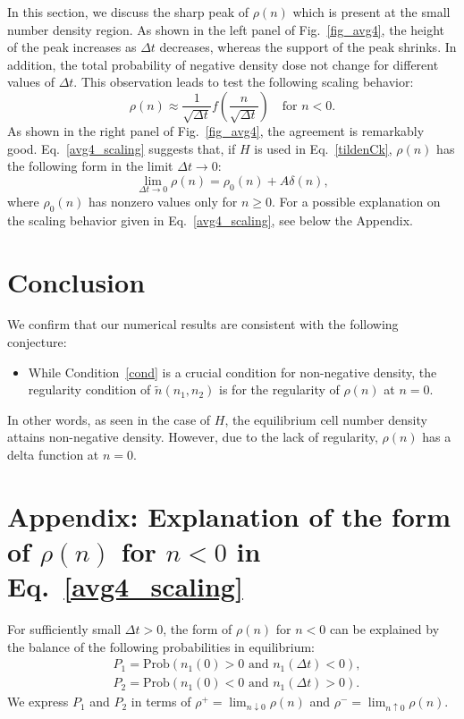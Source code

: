 \documentclass{article}
\begin{document}
In this section, we discuss the sharp peak of $\rho(n)$ which is present at the small number density region.
As shown in the left panel of Fig.~\ref{fig_avg4}, the height of the peak increases as $\Delta t$ decreases, whereas the support of the peak shrinks.
In addition, the total probability of negative density dose not change for different values of $\Delta t$.
This observation leads to test the following scaling behavior:
\begin{equation}
\label{avg4_scaling}
\rho(n)\approx \frac{1}{\sqrt{\Delta t}}f\left(\frac{n}{\sqrt{\Delta t}}\right)\quad\mbox{for $n<0$}.
\end{equation}
As shown in the right panel of Fig.~\ref{fig_avg4}, the agreement is remarkably good.
Eq.~\eqref{avg4_scaling} suggests that, if $H$ is used in Eq.~\eqref{tildenCk}, $\rho(n)$ has the following form in the limit $\Delta t\rightarrow 0$:
\begin{equation}
\lim_{\Delta t\rightarrow 0}\rho(n)=\rho_0(n)+A\delta(n),
\end{equation}
where $\rho_0(n)$ has nonzero values only for $n\ge0$.
For a possible explanation on the scaling behavior given in Eq.~\eqref{avg4_scaling}, see below the Appendix.

\section{Conclusion}

We confirm that our numerical results are consistent with the following conjecture:
\begin{itemize}
\item While Condition~\eqref{cond} is a crucial condition for non-negative density, the regularity condition of $\tilde{n}(n_1,n_2)$ is for the regularity of $\rho(n)$ at $n=0$.
\end{itemize}
In other words, as seen in the case of $H$, the equilibrium cell number density attains non-negative density.
However, due to the lack of regularity, $\rho(n)$ has a delta function at $n=0$. 

\section*{Appendix: Explanation of the form of $\rho(n)$ for $n<0$ in Eq.~\eqref{avg4_scaling}}

For sufficiently small $\Delta t>0$, the form of $\rho(n)$ for $n<0$ can be explained by the balance of the following probabilities in equilibrium:
\begin{align}
&P_1 = \mathrm{Prob}(n_1(0)>0\mbox{ and }n_1(\Delta t)<0),\\
&P_2 = \mathrm{Prob}(n_1(0)<0\mbox{ and }n_1(\Delta t)>0).
\end{align}
We express $P_1$ and $P_2$ in terms of $\rho^+=\lim_{n\downarrow 0}\rho(n)$ and $\rho^-=\lim_{n\uparrow 0}\rho(n)$.
\end{document}
